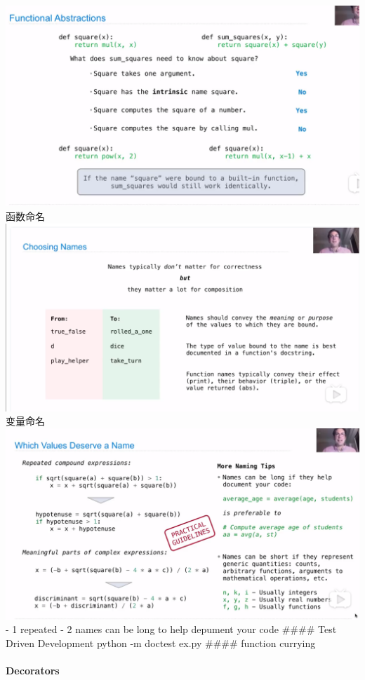 \documentclass[11pt]{article}
\makeatletter
\def\maxwidth{\ifdim\Gin@nat@width>\linewidth\linewidth
    \else\Gin@nat@width\fi}
\let\Oldincludegraphics\includegraphics
\renewcommand{\includegraphics}[1]{\Oldincludegraphics[width=.8\maxwidth]{#1}}
\makeatother
\begin{document}
\includegraphics{./image/function_name.png} 函数命名
\includegraphics{./image/函数命名.png} 变量命名
\includegraphics{./image/变量命名.png} - 1 repeated - 2 names can be
long to help depument your code \#\#\#\# Test Driven Development python
-m doctest ex.py \#\#\#\# function currying

\paragraph{Decorators}\label{decorators}
\end{document}

